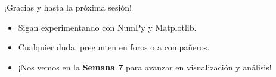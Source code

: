 \documentclass[10pt]{beamer}
\begin{document}
\begin{frame}
  \Huge{\centerline{¡Gracias y hasta la próxima sesión!}}
  \vspace{0.4cm}
  \normalsize
  \begin{itemize}
    \item Sigan experimentando con NumPy y Matplotlib.
    \item Cualquier duda, pregunten en foros o a compañeros.
    \item ¡Nos vemos en la \textbf{Semana 7} para avanzar en visualización y análisis!
  \end{itemize}
\end{frame}
\end{document}
